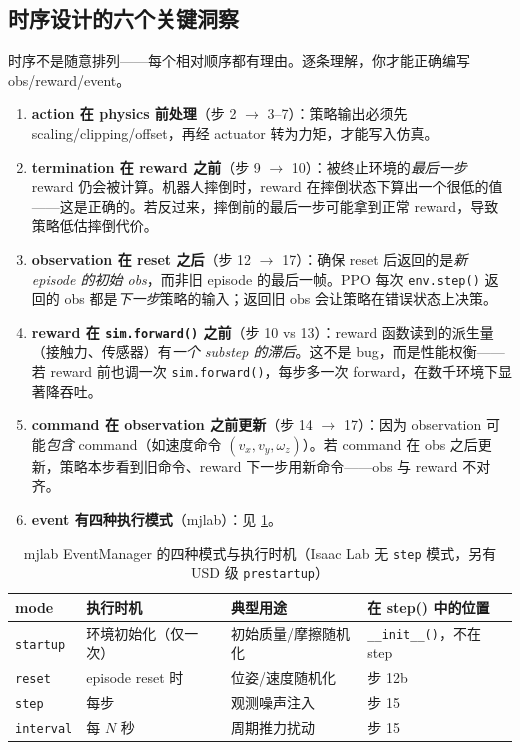 \subsection{时序设计的六个关键洞察}

时序不是随意排列——每个相对顺序都有理由。逐条理解，你才能正确编写 obs/reward/event。

\begin{enumerate}
  \item \textbf{action 在 physics 前处理}（步 2 $\to$ 3--7）：策略输出必须先 scaling/clipping/offset，再经 actuator 转为力矩，才能写入仿真。
  \item \textbf{termination 在 reward 之前}（步 9 $\to$ 10）：被终止环境的\emph{最后一步} reward 仍会被计算。机器人摔倒时，reward 在摔倒状态下算出一个很低的值——这是正确的。若反过来，摔倒前的最后一步可能拿到正常 reward，导致策略低估摔倒代价。
  \item \textbf{observation 在 reset 之后}（步 12 $\to$ 17）：确保 reset 后返回的是\emph{新 episode 的初始 obs}，而非旧 episode 的最后一帧。PPO 每次 \verb|env.step()| 返回的 obs 都是\emph{下一步}策略的输入；返回旧 obs 会让策略在错误状态上决策。
  \item \textbf{reward 在 \texttt{sim.\allowbreak forward()} 之前}（步 10 vs 13）：reward 函数读到的派生量（接触力、传感器）有\emph{一个 substep 的滞后}。这不是 bug，而是性能权衡——若 reward 前也调一次 \verb|sim.forward()|，每步多一次 forward，在数千环境下显著降吞吐。
  \item \textbf{command 在 observation 之前更新}（步 14 $\to$ 17）：因为 observation 可能\emph{包含} command（如速度命令 $(v_x,v_y,\omega_z)$）。若 command 在 obs 之后更新，策略本步看到旧命令、reward 下一步用新命令——obs 与 reward 不对齐。
  \item \textbf{event 有四种执行模式}（mjlab）：见 \cref{tab:rlmc-mgr-eventmode}。
\end{enumerate}

\begin{table}[ht]
\centering
\caption{mjlab EventManager 的四种模式与执行时机（Isaac Lab 无 \texttt{step} 模式，另有 USD 级 \texttt{prestartup}）}
\label{tab:rlmc-mgr-eventmode}
\small
\begin{tabular}{@{}llll@{}}
\toprule
mode & 执行时机 & 典型用途 & 在 step() 中的位置 \\
\midrule
\verb|startup| & 环境初始化（仅一次） & 初始质量/摩擦随机化 & \verb|__init__()|，不在 step \\
\verb|reset| & episode reset 时 & 位姿/速度随机化 & 步 12b \\
\verb|step| & 每步 & 观测噪声注入 & 步 15 \\
\verb|interval| & 每 $N$ 秒 & 周期推力扰动 & 步 15 \\
\bottomrule
\end{tabular}
\end{table}

